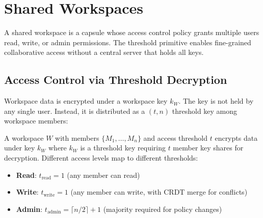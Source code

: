 

\section{Shared Workspaces}
\label{sec:workspaces}

A shared workspace is a capsule whose access control policy grants
multiple users read, write, or admin permissions. The threshold
primitive enables fine-grained collaborative access without a
central server that holds all keys.

\subsection{Access Control via Threshold Decryption}

Workspace data is encrypted under a workspace key $k_W$. The key is
not held by any single user. Instead, it is distributed as a $(t, n)$
threshold key among workspace members:

\begin{definition}
A workspace $W$ with members $\{M_1, \ldots, M_n\}$ and access threshold
$t$ encrypts data under key $k_W$ where $k_W$ is a threshold key requiring
$t$ member key shares for decryption. Different access levels map to
different thresholds:
\begin{itemize}
    \item \textbf{Read}: $t_{\text{read}} = 1$ (any member can read)
    \item \textbf{Write}: $t_{\text{write}} = 1$ (any member can write, with CRDT merge for conflicts)
    \item \textbf{Admin}: $t_{\text{admin}} = \lceil n/2 \rceil + 1$ (majority required for policy changes)
\end{itemize}
\end{definition}

